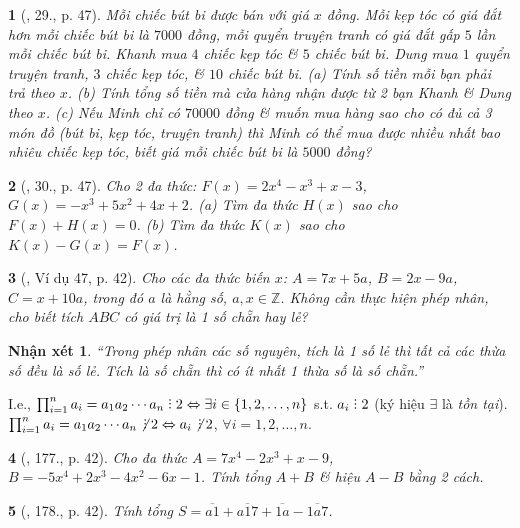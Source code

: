 \documentclass{article}
\newtheorem{baitoan}{}
\newtheorem{nhanxet}{Nhận xét}
\DeclareRobustCommand{\divby}{%
	\mathrel{\vbox{\baselineskip.65ex\lineskiplimit0pt\hbox{.}\hbox{.}\hbox{.}}}%
}
\begin{document}
\begin{baitoan}[\cite{SBT_Toan_7_Canh_Dieu_tap_2}, 29., p. 47]
	Mỗi chiếc bút bi được bán với giá $x$ đồng. Mỗi kẹp tóc có giá đắt hơn mỗi chiếc bút bi là $7000$ đồng, mỗi quyển truyện tranh có giá đắt gấp $5$ lần mỗi chiếc bút bi. Khanh mua $4$ chiếc kẹp tóc \& $5$ chiếc bút bi. Dung mua $1$ quyển truyện tranh, $3$ chiếc kẹp tóc, \& $10$ chiếc bút bi. (a) Tính số tiền mỗi bạn phải trả theo $x$. (b) Tính tổng số tiền mà cửa hàng nhận được từ 2 bạn Khanh \& Dung theo $x$. (c) Nếu Minh chỉ có $70000$ đồng \& muốn mua hàng sao cho có đủ cả 3 món đồ (bút bi, kẹp tóc, truyện tranh) thì Minh có thể mua được nhiều nhất bao nhiêu chiếc kẹp tóc, biết giá mỗi chiếc bút bi là $5000$ đồng?
\end{baitoan}

\begin{baitoan}[\cite{SBT_Toan_7_Canh_Dieu_tap_2}, 30., p. 47]
	Cho 2 đa thức: $F(x) = 2x^4 - x^3 + x - 3$, $G(x) = -x^3 + 5x^2 + 4x + 2$. (a) Tìm đa thức $H(x)$ sao cho $F(x) + H(x) = 0$. (b) Tìm đa thức $K(x)$ sao cho $K(x) - G(x) = F(x)$.
\end{baitoan}

\begin{baitoan}[\cite{Tuyen_Toan_7}, Ví dụ 47, p. 42]
	Cho các đa thức biến $x$: $A = 7x + 5a$, $B = 2x - 9a$, $C = x + 10a$, trong đó $a$ là hằng số, $a,x\in\mathbb{Z}$. Không cần thực hiện phép nhân, cho biết tích $ABC$ có giá trị là 1 số chẵn hay lẻ?
\end{baitoan}

\begin{nhanxet}
	``Trong phép nhân các số nguyên, tích là 1 số lẻ thì tất cả các thừa số đều là số lẻ. Tích là số chẵn thì có ít nhất 1 thừa số là số chẵn.''
\end{nhanxet}
I.e., $\prod_{i=1}^n a_i = a_1a_2\cdots a_n\divby2\Leftrightarrow\exists i\in\{1,2,\ldots,n\}$ s.t. $a_i\divby2$ (ký hiệu $\exists$ là \textit{tồn tại}). $\prod_{i=1}^n a_i = a_1a_2\cdots a_n\not\,\divby2\Leftrightarrow a_i\not\,\divby2$, $\forall i = 1,2,\ldots,n$.

\begin{baitoan}[\cite{Tuyen_Toan_7}, 177., p. 42]
	Cho đa thức $A = 7x^4 - 2x^3 + x - 9$, $B = -5x^4 + 2x^3 - 4x^2 - 6x - 1$. Tính tổng $A + B$ \& hiệu $A - B$ bằng 2 cách.
\end{baitoan}

\begin{baitoan}[\cite{Tuyen_Toan_7}, 178., p. 42]
	Tính tổng $S = \overline{a1} + \overline{a17} + \overline{1a} - \overline{1a7}$.
\end{baitoan}
\end{document}

